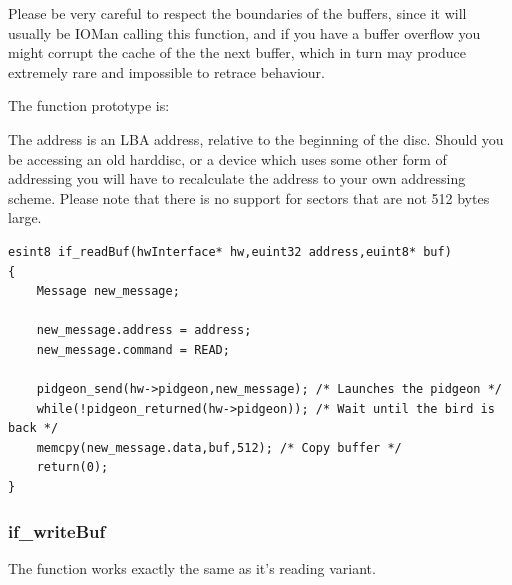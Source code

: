 Please be very careful to respect the boundaries of the buffers, since it will usually be IOMan
calling this function, and if you have a buffer overflow you might corrupt the cache of the
the next buffer, which in turn may produce extremely rare and impossible to retrace behaviour.

The function prototype is:\\

The address is an LBA address, relative to the beginning of the disc. Should you be
accessing an old harddisc, or a device which uses some other form of addressing you will have to
recalculate the address to your own addressing scheme. Please note that there is no support
for sectors that are not 512 bytes large.

\begin{lstlisting}
esint8 if_readBuf(hwInterface* hw,euint32 address,euint8* buf)
{
	Message new_message;

	new_message.address = address;
	new_message.command = READ;

	pidgeon_send(hw->pidgeon,new_message); /* Launches the pidgeon */
	while(!pidgeon_returned(hw->pidgeon)); /* Wait until the bird is back */
	memcpy(new_message.data,buf,512); /* Copy buffer */
	return(0);
}
\end{lstlisting}

\subsubsection{if\_writeBuf}
The function  works exactly the same as it's reading variant.
